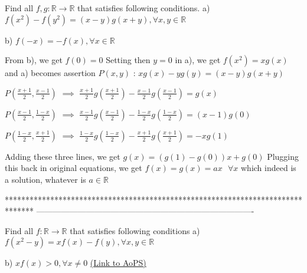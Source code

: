 \begin{solution}
	\begin{tcolorbox}Find all $ f,g: \mathbb{R}\rightarrow \mathbb{R} $   that satisfies following conditions.
a) $f(x^{2})-f(y^{2})=\left ( x-y \right )g\left ( x+y \right ),\forall x,y\in \mathbb{R}$

b) $f(-x)=-f(x),\forall x\in \mathbb{R}$\end{tcolorbox}
From b), we get $f(0)=0$
Setting then $y=0$ in a), we get $f(x^2)=xg(x)$ and a) becomes assertion $P(x,y)$ : $xg(x)-yg(y)=(x-y)g(x+y)$

$P(\frac{x+1}2,\frac{x-1}2)$ $\implies$ $\frac{x+1}2g(\frac{x+1}2)-\frac{x-1}2g(\frac{x-1}2)=g(x)$

$P(\frac{x-1}2,\frac{1-x}2)$ $\implies$ $\frac{x-1}2g(\frac{x-1}2)-\frac{1-x}2g(\frac{1-x}2)=(x-1)g(0)$

$P(\frac{1-x}2,\frac{x+1}2)$ $\implies$ $\frac{1-x}2g(\frac{1-x}2)-\frac{x+1}2g(\frac{x+1}2)=-xg(1)$

Adding these three lines, we get $g(x)=(g(1)-g(0))x+g(0)$
Plugging this back in original equations, we get $\boxed{f(x)=g(x)=ax\text{  }\forall x}$ which indeed is a solution, whatever is $a\in\mathbb R$
\end{solution}
*******************************************************************************
-------------------------------------------------------------------------------

\begin{problem}
	Find all $ f: \mathbb{R}\rightarrow \mathbb{R} $   that satisfies following conditions
a)  $f\left ( x^{2}-y \right )=xf(x)-f(y),\forall x,y\in \mathbb{R}$

b)  $xf(x)> 0,\forall x\neq 0$
	\flushright \href{https://artofproblemsolving.com/community/c6h618329}{(Link to AoPS)}
\end{problem}



